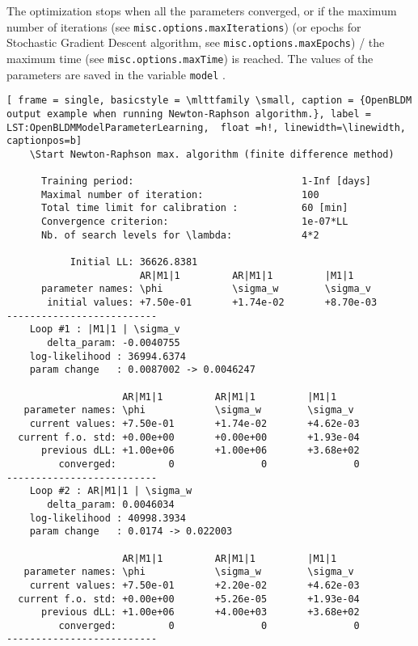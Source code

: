 The optimization stops when all the parameters converged, or if the maximum number of iterations (see \lstinline[basicstyle = \mlttfamily \small ]!misc.options.maxIterations!) (or epochs for Stochastic Gradient Descent algorithm, see \lstinline[basicstyle = \mlttfamily \small ]!misc.options.maxEpochs!) / the maximum time (see \lstinline[basicstyle = \mlttfamily \small ]!misc.options.maxTime!) is reached.
The values of the parameters are saved in the variable \lstinline[basicstyle = \mlttfamily \small ]!model! \MATLAB{}.
 
 \begin{lstlisting}[ frame = single, basicstyle = \mlttfamily \small, caption = {OpenBLDM output example when running Newton-Raphson algorithm.}, label = LST:OpenBLDMModelParameterLearning,  float =h!, linewidth=\linewidth, captionpos=b]
    \Start Newton-Raphson max. algorithm (finite difference method)

      Training period:                             1-Inf [days]
      Maximal number of iteration:                 100
      Total time limit for calibration :           60 [min]
      Convergence criterion:                       1e-07*LL
      Nb. of search levels for \lambda:            4*2

           Initial LL: 36626.8381
                       AR|M1|1         AR|M1|1         |M1|1            
      parameter names: \phi            \sigma_w        \sigma_v         
       initial values: +7.50e-01       +1.74e-02       +8.70e-03       
--------------------------
    Loop #1 : |M1|1 | \sigma_v 
       delta_param: -0.0040755 
    log-likelihood : 36994.6374
    param change   : 0.0087002 -> 0.0046247

                    AR|M1|1         AR|M1|1         |M1|1           
   parameter names: \phi            \sigma_w        \sigma_v        
    current values: +7.50e-01       +1.74e-02       +4.62e-03      
  current f.o. std: +0.00e+00       +0.00e+00       +1.93e-04      
      previous dLL: +1.00e+06       +1.00e+06       +3.68e+02      
         converged:         0               0               0      
--------------------------
    Loop #2 : AR|M1|1 | \sigma_w 
       delta_param: 0.0046034 
    log-likelihood : 40998.3934
    param change   : 0.0174 -> 0.022003

                    AR|M1|1         AR|M1|1         |M1|1           
   parameter names: \phi            \sigma_w        \sigma_v        
    current values: +7.50e-01       +2.20e-02       +4.62e-03      
  current f.o. std: +0.00e+00       +5.26e-05       +1.93e-04      
      previous dLL: +1.00e+06       +4.00e+03       +3.68e+02      
         converged:         0               0               0      
--------------------------
\end{lstlisting}



